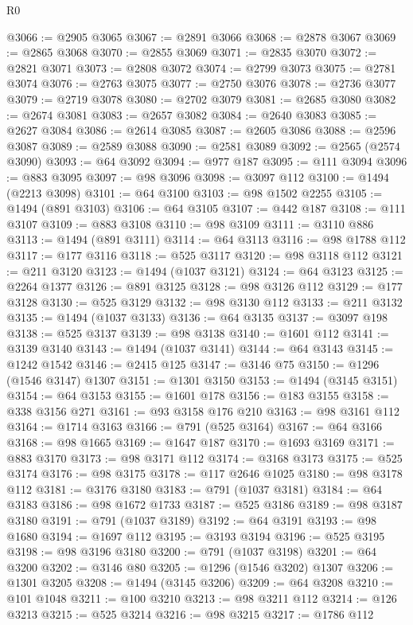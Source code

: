\begin{lexlean}{R0}
\begin{coremodule}
@3066 := @2905 @3065
@3067 := @2891 @3066
@3068 := @2878 @3067
@3069 := @2865 @3068
@3070 := @2855 @3069
@3071 := @2835 @3070
@3072 := @2821 @3071
@3073 := @2808 @3072
@3074 := @2799 @3073
@3075 := @2781 @3074
@3076 := @2763 @3075
@3077 := @2750 @3076
@3078 := @2736 @3077
@3079 := @2719 @3078
@3080 := @2702 @3079
@3081 := @2685 @3080
@3082 := @2674 @3081
@3083 := @2657 @3082
@3084 := @2640 @3083
@3085 := @2627 @3084
@3086 := @2614 @3085
@3087 := @2605 @3086
@3088 := @2596 @3087
@3089 := @2589 @3088
@3090 := @2581 @3089
@3092 := @2565 (@2574 @3090)
@3093 := @64 @3092
@3094 := @977 @187
@3095 := @111 @3094
@3096 := @883 @3095
@3097 := @98 @3096
@3098 := @3097 @112
@3100 := @1494 (@2213 @3098)
@3101 := @64 @3100
@3103 := @98 @1502 @2255
@3105 := @1494 (@891 @3103)
@3106 := @64 @3105
@3107 := @442 @187
@3108 := @111 @3107
@3109 := @883 @3108
@3110 := @98 @3109
@3111 := @3110 @886
@3113 := @1494 (@891 @3111)
@3114 := @64 @3113
@3116 := @98 @1788 @112
@3117 := @177 @3116
@3118 := @525 @3117
@3120 := @98 @3118 @112
@3121 := @211 @3120
@3123 := @1494 (@1037 @3121)
@3124 := @64 @3123
@3125 := @2264 @1377
@3126 := @891 @3125
@3128 := @98 @3126 @112
@3129 := @177 @3128
@3130 := @525 @3129
@3132 := @98 @3130 @112
@3133 := @211 @3132
@3135 := @1494 (@1037 @3133)
@3136 := @64 @3135
@3137 := @3097 @198
@3138 := @525 @3137
@3139 := @98 @3138
@3140 := @1601 @112
@3141 := @3139 @3140
@3143 := @1494 (@1037 @3141)
@3144 := @64 @3143
@3145 := @1242 @1542
@3146 := @2415 @125
@3147 := @3146 @75
@3150 := @1296 (@1546 @3147) @1307
@3151 := @1301 @3150
@3153 := @1494 (@3145 @3151)
@3154 := @64 @3153
@3155 := @1601 @178
@3156 := @183 @3155
@3158 := @338 @3156 @271
@3161 := @93 @3158 @176 @210
@3163 := @98 @3161 @112
@3164 := @1714 @3163
@3166 := @791 (@525 @3164)
@3167 := @64 @3166
@3168 := @98 @1665
@3169 := @1647 @187
@3170 := @1693 @3169
@3171 := @883 @3170
@3173 := @98 @3171 @112
@3174 := @3168 @3173
@3175 := @525 @3174
@3176 := @98 @3175
@3178 := @117 @2646 @1025
@3180 := @98 @3178 @112
@3181 := @3176 @3180
@3183 := @791 (@1037 @3181)
@3184 := @64 @3183
@3186 := @98 @1672 @1733
@3187 := @525 @3186
@3189 := @98 @3187 @3180
@3191 := @791 (@1037 @3189)
@3192 := @64 @3191
@3193 := @98 @1680
@3194 := @1697 @112
@3195 := @3193 @3194
@3196 := @525 @3195
@3198 := @98 @3196 @3180
@3200 := @791 (@1037 @3198)
@3201 := @64 @3200
@3202 := @3146 @80
@3205 := @1296 (@1546 @3202) @1307
@3206 := @1301 @3205
@3208 := @1494 (@3145 @3206)
@3209 := @64 @3208
@3210 := @101 @1048
@3211 := @100 @3210
@3213 := @98 @3211 @112
@3214 := @126 @3213
@3215 := @525 @3214
@3216 := @98 @3215
@3217 := @1786 @112

\end{coremodule}
\end{lexlean}
